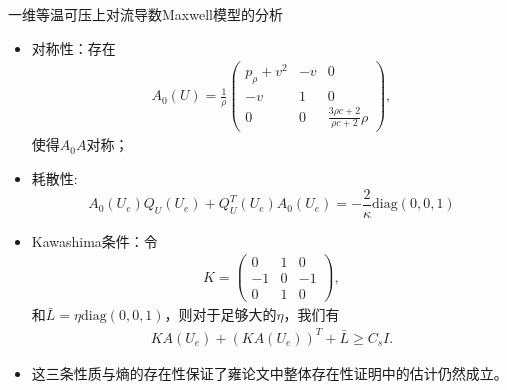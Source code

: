 \documentclass[mathserif]{beamer}
\begin{document}
\begin{frame}{一维等温可压上对流导数Maxwell模型的分析}
\small{
\begin{itemize}
	\item 对称性：存在
	\begin{eqnarray*}%
A_0(U) = \frac{1}{\rho} \left( \begin{smallmatrix} %
	 p_\rho  +v^2 & -v & 0 \\ %
	-v & 1 & 0 \\[2mm]
	0 & 0 & \frac{3\rho c+2}{\rho c+2}\rho  %
	\end{smallmatrix}
	 \right),
\end{eqnarray*}
使得$A_0A$对称；
\item 耗散性:
\begin{equation*}%
A_0(U_e)Q_U(U_e) + Q_U^T(U_e)A_0(U_e) =-\frac{2}{\kappa}\mbox{diag}(0, 0, 1)
\end{equation*}
	\item Kawashima条件：令
\begin{eqnarray*}%
K=\left( \begin{smallmatrix}%
	0 & 1 & 0 \\
	-1 & 0 & -1 \\
	0 & 1 & 0
	\end{smallmatrix}
	\right),
\end{eqnarray*}
和$\bar{L} = \eta\mbox{diag}(0, 0, 1)$，则对于足够大的$\eta$，我们有
\begin{eqnarray*}%
K A(U_e) + (K A(U_e))^T + \bar{L} \ge C_s I.
\end{eqnarray*}
\item<2-> 这三条性质与熵的存在性保证了雍论文中整体存在性证明中的估计仍然成立。
\end{itemize}}
\end{frame}
\end{document}
